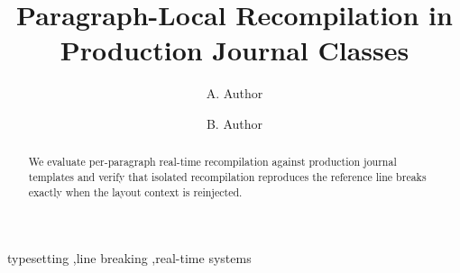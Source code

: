 \begin{frontmatter}
\title{Paragraph-Local Recompilation in Production Journal Classes}
\author[a]{A. Author}
\author[a]{B. Author}
\begin{abstract}
We evaluate per-paragraph real-time recompilation against production
journal templates and verify that isolated recompilation reproduces the
reference line breaks exactly when the layout context is reinjected.
\end{abstract}
\begin{keyword}
typesetting \sep line breaking \sep real-time systems
\end{keyword}
\end{frontmatter}
